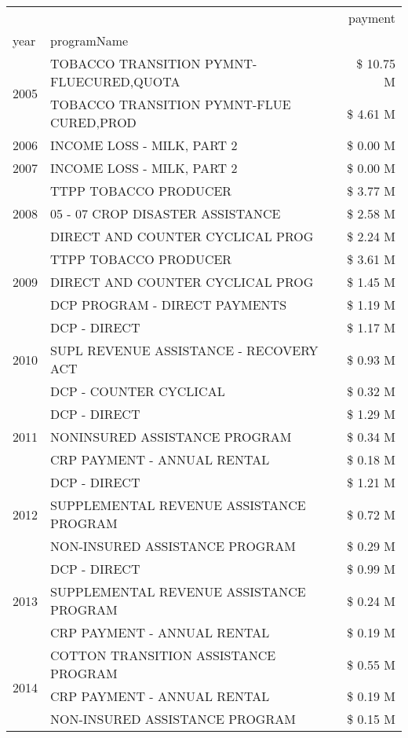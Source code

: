 \begin{tabular}{llr}
\toprule
 &  & payment \\
year & programName &  \\
\midrule
\multirow[t]{2}{*}{2005} & TOBACCO TRANSITION PYMNT-FLUECURED,QUOTA & \$ 10.75 M \\
 & TOBACCO TRANSITION PYMNT-FLUE CURED,PROD & \$ 4.61 M \\
\cline{1-3}
2006 & INCOME LOSS - MILK, PART 2 & \$ 0.00 M \\
\cline{1-3}
2007 & INCOME LOSS - MILK, PART 2 & \$ 0.00 M \\
\cline{1-3}
\multirow[t]{3}{*}{2008} & TTPP TOBACCO PRODUCER & \$ 3.77 M \\
 & 05 - 07 CROP DISASTER ASSISTANCE & \$ 2.58 M \\
 & DIRECT AND COUNTER CYCLICAL PROG & \$ 2.24 M \\
\cline{1-3}
\multirow[t]{3}{*}{2009} & TTPP TOBACCO PRODUCER & \$ 3.61 M \\
 & DIRECT AND COUNTER CYCLICAL PROG & \$ 1.45 M \\
 & DCP PROGRAM - DIRECT PAYMENTS & \$ 1.19 M \\
\cline{1-3}
\multirow[t]{3}{*}{2010} & DCP - DIRECT & \$ 1.17 M \\
 & SUPL REVENUE ASSISTANCE - RECOVERY ACT & \$ 0.93 M \\
 & DCP - COUNTER CYCLICAL & \$ 0.32 M \\
\cline{1-3}
\multirow[t]{3}{*}{2011} & DCP - DIRECT & \$ 1.29 M \\
 & NONINSURED ASSISTANCE PROGRAM & \$ 0.34 M \\
 & CRP PAYMENT - ANNUAL RENTAL & \$ 0.18 M \\
\cline{1-3}
\multirow[t]{3}{*}{2012} & DCP - DIRECT & \$ 1.21 M \\
 & SUPPLEMENTAL REVENUE ASSISTANCE PROGRAM & \$ 0.72 M \\
 & NON-INSURED ASSISTANCE PROGRAM & \$ 0.29 M \\
\cline{1-3}
\multirow[t]{3}{*}{2013} & DCP - DIRECT & \$ 0.99 M \\
 & SUPPLEMENTAL REVENUE ASSISTANCE PROGRAM & \$ 0.24 M \\
 & CRP PAYMENT - ANNUAL RENTAL & \$ 0.19 M \\
\cline{1-3}
\multirow[t]{3}{*}{2014} & COTTON TRANSITION ASSISTANCE PROGRAM & \$ 0.55 M \\
 & CRP PAYMENT - ANNUAL RENTAL & \$ 0.19 M \\
 & NON-INSURED ASSISTANCE PROGRAM & \$ 0.15 M \\

\end{tabular}
